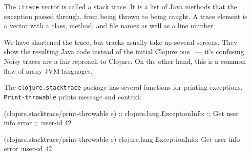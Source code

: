\else

\begin{english}
\end{english}

\fi


The \verb|:trace| vector is called a stack trace. It is a list of Java methods that the exception passed through, from being thrown to being caught. A trace element is a vector with a class, method, and file names as well as a line number.

We have shortened the trace, but tracks usually take up several screens. They show the resulting Java code instead of the initial Clojure one ~--- it's confusing. Noisy traces are a fair reproach to Clojure. On the other hand, this is a common flaw of many JVM languages.


\mnoindent
The \verb|clojure.stacktrace| package has several functions for printing exceptions. \verb|Print-throwable| prints message and context:

\ifx\DEVICETYPE\MOBILE

\begin{english}
  \begin{clojure}
(clojure.stacktrace/print-throwable e)
;; clojure.lang.ExceptionInfo:
;; Get user info error
;; {:user-id 42}
  \end{clojure}
\end{english}

\else

\begin{english}
  \begin{clojure}
(clojure.stacktrace/print-throwable e)
clojure.lang.ExceptionInfo: Get user info error
{:user-id 42}
  \end{clojure}
\end{english}

